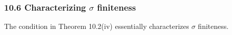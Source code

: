 \documentclass[12pt,a4paper]{article}
\newcommand{\1}[1]{\mathbbm{1}\left\{ #1 \right\}}
\newcommand{\fcal}{\mathcal{F}}
\begin{document}

\subsubsection{10.6 Characterizing $\sigma$ finiteness} The condition in Theorem 10.2(iv) essentially characterizes $\sigma$ finiteness.
\end{document}
